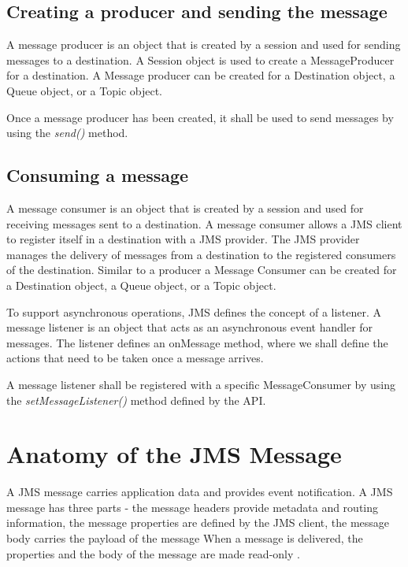\documentclass[9pt,twocolumn,twoside]{../../styles/osajnl}
\begin{document}
\subsection{Creating a producer and sending the message}

A message producer is an object that is created by a session and used
for sending messages to a destination.  A Session object is used to
create a MessageProducer for a destination. A Message producer can be
created for a Destination object, a Queue object, or a Topic object.

Once a message producer has been created, it shall be used to send
messages by using the \emph{send()} method.

\subsection{Consuming a message}

A message consumer is an object that is created by a session and used
for receiving messages sent to a destination.  A message consumer
allows a JMS client to register itself in a destination with a JMS
provider. The JMS provider manages the delivery of messages from a
destination to the registered consumers of the destination.  Similar
to a producer a Message Consumer can be created for a Destination
object, a Queue object, or a Topic object.

To support asynchronous operations, JMS defines the concept of a
listener.  A message listener is an object that acts as an
asynchronous event handler for messages. The listener defines an
onMessage method, where we shall define the actions that need to be
taken once a message arrives.

A message listener shall be registered with a specific MessageConsumer
by using the \emph{setMessageListener()} method defined by the API.

\section{Anatomy of the JMS Message}


A JMS message carries application data and provides event
notification.  A JMS message has three parts - the message headers
provide metadata and routing information, the message properties are
defined by the JMS client, the message body carries the payload of the
message When a message is delivered, the properties and the body of
the message are made read-only \cite{www-jms-fischli-article}.
\end{document}
